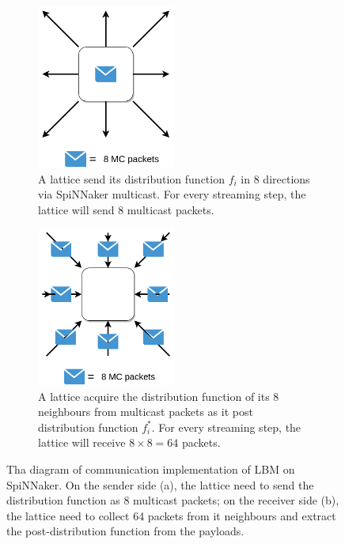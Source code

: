 \begin{figure}[!tb]

\begin{subfigure}[!tb]{0.5\textwidth}
       \centering
       \includegraphics[width=0.5\textwidth]{figures/send.png}
       \caption{A lattice send its distribution function $f_i$ in 8 directions via SpiNNaker multicast. For every streaming step, the lattice will send 8 multicast packets.}
       \label{fig:spinn_send}
   \end{subfigure}
   \begin{subfigure}[!tb]{0.5\textwidth}
   \centering
       \includegraphics[width=0.5\textwidth]{figures/receive.png}
       \caption{A lattice acquire the distribution function of its 8 neighbours from multicast packets as it post distribution function $f_i^{*}$. For every streaming step, the lattice will receive $8\times8=64$ packets.}
       \label{fig:spinn_receive}
   \end{subfigure}
   \caption{Tha diagram of communication implementation of LBM on SpiNNaker. On the sender side (a), the lattice need to send the distribution function as 8 multicast packets; on the receiver side (b), the lattice need to collect 64 packets from it neighbours and extract the post-distribution function from the payloads.}
\end{figure}

